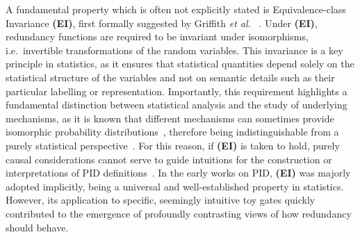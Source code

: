 \documentclass{article}
\makeatletter
\newcommand{\etal}{\textit{et al.\@} }
\newcommand{\EI}{\textbf{(EI)}\xspace} %
\makeatother
\begin{document}
A fundamental property which is often not explicitly stated is Equivalence-class Invariance \EI, first formally suggested by Griffith \etal~\cite{griffith2014intersection}. Under \EI, redundancy functions are required to be invariant under isomorphisms, i.e.\ invertible transformations of the random variables. This invariance is a key principle in statistics, as it ensures that statistical quantities depend solely on the statistical structure of the variables and not on semantic details such as their particular labelling or representation. Importantly, this requirement highlights a fundamental distinction between statistical analysis and the study of underlying mechanisms, as it is known that different mechanisms can sometimes provide isomorphic probability distributions~\cite{pearl2014probabilistic}, therefore being indistinguishable from a purely statistical perspective~\cite{james2017multivariate}. For this reason, if \EI is taken to hold, purely causal considerations cannot serve to guide intuitions for the construction or interpretations of PID definitions~\cite{finn2018pointwise}. In the early works on PID, \EI was majorly adopted implicitly, being a universal and well-established property in statistics. However, its application to specific, seemingly intuitive toy gates quickly contributed to the emergence of profoundly contrasting views of how redundancy should behave.
\end{document}
